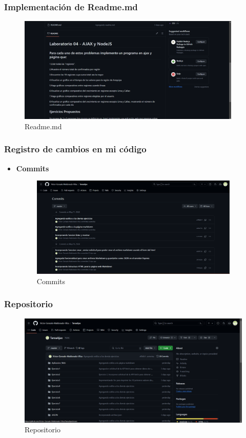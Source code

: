 \documentclass{article}
\begin{document}
	\subsubsection{Implementación de Readme.md}
	\begin{figure}[H]
		\centering
		\includegraphics[width=0.95\textwidth,keepaspectratio]{img/readme.png}
		\caption{Readme.md}
	\end{figure}
	\subsubsection{Registro de cambios en mi código}
	\begin{itemize}
		\item \textbf{Commits}
		\begin{figure}[H]
			\centering
			\includegraphics[width=0.94\textwidth,keepaspectratio]{img/Commits.png}
			\caption{Commits}
		\end{figure}
	\end{itemize}
	
	\subsubsection{Repositorio}
	\begin{figure}[H]
		\centering
		\includegraphics[width=1\textwidth,keepaspectratio]{img/Repositorio.png}
		\caption{Repositorio}
	\end{figure}
\end{document}
